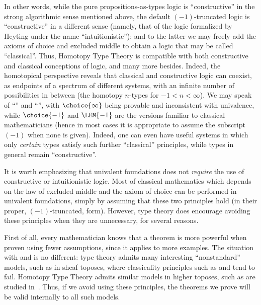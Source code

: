 In other words, while the pure propositions-as-types logic is ``constructive'' in the strong algorithmic sense mentioned above,
the default $(-1)$-truncated logic is ``constructive'' in a different sense (namely, that of the logic formalized by Heyting under the name ``intuitionistic'');
and to the latter we may freely add the axioms of choice and excluded middle to obtain a logic that may be called ``classical''.
Thus, Homotopy Type Theory is compatible with both constructive and classical conceptions of logic, and many more besides.
%
Indeed, the homotopical perspective reveals that classical and constructive logic can coexist, as endpoints of a spectrum of different systems,
with an infinite number of possibilities in between (the homotopy $n$-types for $-1 < n < \infty$).
We may speak of ``'' and ``'', with $\choice{\infty}$ being provable and \LEM{\infty} inconsistent with univalence,
while $\choice{-1}$ and $\LEM{-1}$ are the versions familiar to classical mathematicians (hence in most cases it is appropriate to assume the subscript $(-1)$ when none is given).
Indeed, one can even have useful systems in which only \emph{certain} types satisfy such further ``classical'' principles,
while types in general remain ``constructive''.%

It is worth emphasizing that univalent foundations does not \emph{require} the use of constructive or intuitionistic logic. %
Most of classical mathematics which depends on the law of excluded middle and the axiom of choice can be performed in univalent foundations,
simply by assuming that these two principles hold (in their proper, $(-1)$-truncated, form).
However, type theory does encourage avoiding these principles when they are unnecessary, for several reasons.

First of all, every mathematician knows that a theorem is more powerful when proven using fewer assumptions, since it applies to more examples.
The situation with \choice{} and \LEM{} is no different:
type theory admits many interesting ``nonstandard'' models, such as in sheaf toposes, where classicality principles such as \choice{} and \LEM{} tend to fail.
Homotopy Type Theory admits similar models in higher toposes, such as are studied in~\cite{ToenVezzosi02,Rezk05,lurie:higher-topoi}.
Thus, if we avoid using these principles, the theorems we prove will be valid internally to all such models.

